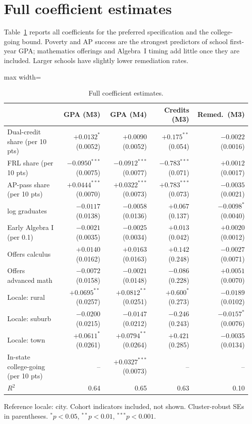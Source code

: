 \documentclass[aps,prd,reprint,superscriptaddress,nofootinbib,floatfix]{revtex4-2}
\begin{document}
\section{Full coefficient estimates}\label{app:full}

Table~\ref{tab:full} reports all coefficients for the preferred specification and the college-going bound. Poverty and AP success are the strongest predictors of school first-year GPA; mathematics offerings and Algebra~I timing add little once they are included. Larger schools have slightly lower remediation rates.

\begin{table}[t]
\caption{Full coefficient estimates.}
\label{tab:full}
\footnotesize
\begin{adjustbox}{max width=\linewidth}
\begin{tabular}{lrrrr}
\hline\hline
 & GPA (M3) & GPA (M4) & Credits (M3) & Remed.\ (M3) \\
\hline
Dual-credit share (per 10 pts) & $+0.0132^{*}$ (0.0052) & $+0.0090$ (0.0052) & $+0.175^{**}$ (0.054) & $-0.0022$ (0.0016) \\
FRL share (per 10 pts) & $-0.0950^{***}$ (0.0075) & $-0.0912^{***}$ (0.0077) & $-0.783^{***}$ (0.071) & $+0.0012$ (0.0017) \\
AP-pass share (per 10 pts) & $+0.0444^{***}$ (0.0070) & $+0.0322^{***}$ (0.0073) & $+0.783^{***}$ (0.073) & $-0.0035$ (0.0021) \\
log graduates & $-0.0117$ (0.0138) & $-0.0058$ (0.0136) & $+0.067$ (0.137) & $-0.0098^{*}$ (0.0040) \\
Early Algebra I (per 0.1) & $-0.0021$ (0.0035) & $-0.0025$ (0.0034) & $+0.013$ (0.042) & $+0.0020$ (0.0012) \\
Offers calculus & $+0.0140$ (0.0162) & $+0.0163$ (0.0163) & $+0.142$ (0.248) & $-0.0027$ (0.0071) \\
Offers advanced math & $-0.0072$ (0.0158) & $-0.0021$ (0.0148) & $-0.086$ (0.228) & $+0.0051$ (0.0070) \\
Locale: rural & $+0.0695^{**}$ (0.0257) & $+0.0812^{**}$ (0.0251) & $+0.600^{*}$ (0.273) & $-0.0189$ (0.0102) \\
Locale: suburb & $-0.0200$ (0.0215) & $-0.0147$ (0.0212) & $-0.246$ (0.243) & $-0.0157^{*}$ (0.0076) \\
Locale: town & $+0.0611^{*}$ (0.0261) & $+0.0794^{**}$ (0.0264) & $+0.421$ (0.285) & $-0.0035$ (0.0134) \\
In-state college-going (per 10 pts) & -- & $+0.0327^{***}$ (0.0073) & -- & -- \\
\hline
$R^2$ & 0.64 & 0.65 & 0.63 & 0.10 \\
\hline\hline
\end{tabular}
\end{adjustbox}
\par\smallskip\parbox{0.92\linewidth}{\scriptsize Reference locale: city. Cohort indicators included, not shown. Cluster-robust SEs in parentheses. $^{*}p<0.05$, $^{**}p<0.01$, $^{***}p<0.001$.}
\end{table}
\end{document}

